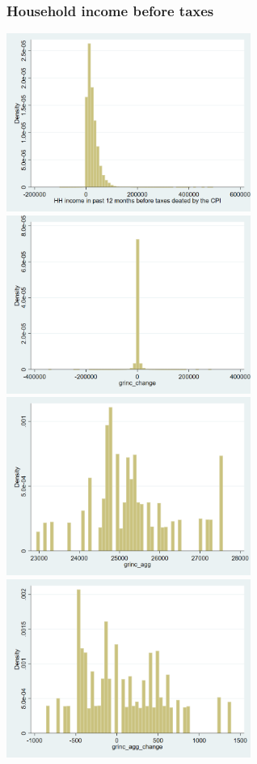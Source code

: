 \documentclass[12pt,a4paper]{article}
\begin{document}
\subsubsection*{Household income before taxes}
\begin{center}
\includegraphics[width=8cm]{graphs/grinc.png}
\includegraphics[width=8cm]{graphs/grinc_change.png}\\
\includegraphics[width=8cm]{graphs/grinc_agg.png}
\includegraphics[width=8cm]{graphs/grinc_agg_change.png}\\

\end{center}
\end{document}

